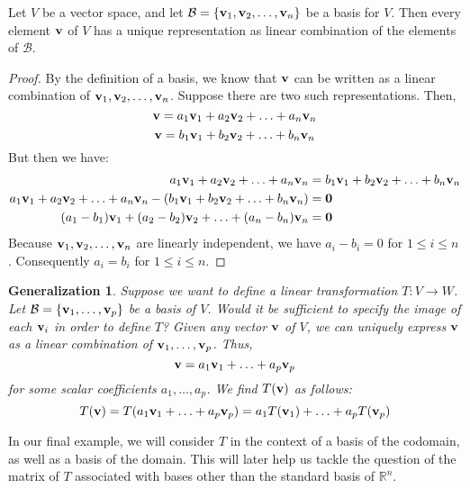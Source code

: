 \documentclass{ximera}
\renewcommand{\vec}[1]{{\bf #1}}
\newcommand{\RR}{\mathbb{R}}
\newtheorem{general}{Generalization}
\begin{document}
\begin{lemma}\label{lemma:uniquerep}
Let $V$ be a vector space, and let $\mathcal{B}=\{\vec{v}_1, \vec{v}_2,\ldots,\vec{v}_n\}$ be a basis for $V$.  Then every element $\vec{v}$ of $V$ has a unique representation as linear combination of the elements of $\mathcal{B}$.
\end{lemma}
\begin{proof}
By the definition of a basis, we know that $\vec{v}$ can be written as a linear combination of $\vec{v}_1, \vec{v}_2,\ldots,\vec{v}_n$.  Suppose there are two such representations.  Then,
$$\vec{v}=a_1\vec{v}_1+ a_2\vec{v}_2+\ldots+a_n\vec{v}_n$$
$$\vec{v}=b_1\vec{v}_1+ b_2\vec{v}_2+\ldots+b_n\vec{v}_n$$
But then we have:
\begin{align*}
a_1\vec{v}_1+ a_2\vec{v}_2+\ldots+a_n\vec{v}_n&=b_1\vec{v}_1+ b_2\vec{v}_2+\ldots+b_n\vec{v}_n\\
a_1\vec{v}_1+ a_2\vec{v}_2+\ldots+a_n\vec{v}_n-(b_1\vec{v}_1+ b_2\vec{v}_2+\ldots+b_n\vec{v}_n)&=\vec{0}\\
(a_1-b_1)\vec{v}_1+ (a_2-b_2)\vec{v}_2+\ldots+(a_n-b_n)\vec{v}_n&=\vec{0}
\end{align*}
Because $\vec{v}_1, \vec{v}_2,\ldots,\vec{v}_n$ are linearly independent, we have $a_i-b_i=0$ for $1\leq i\leq n$. Consequently $a_i=b_i$ for $1\leq i\leq n$.
\end{proof}

\begin{general}
Suppose we want to define a linear transformation $T:V\rightarrow W$.  Let $\mathcal{B}=\{\vec{v}_1,\ldots,\vec{v}_p\}$ be a basis of $V$.  Would it be sufficient to specify the image of each $\vec{v}_i$ in order to define $T$?
Given any vector $\vec{v}$ of $V$, we can uniquely express $\vec{v}$ as a linear combination of $\vec{v}_1,\ldots,\vec{v}_p$.  Thus,
$$\vec{v}=a_1\vec{v}_1+\ldots+a_p\vec{v}_p$$ for some scalar coefficients $a_1,\ldots,a_p$.
We find $T(\vec{v})$ as follows:
$$T(\vec{v})=T(a_1\vec{v}_1+\ldots+a_p\vec{v}_p)=a_1T(\vec{v}_1)+\ldots+a_pT(\vec{v}_p)$$
\end{general}

In our final example, we will consider $T$ in the context of a basis of the codomain, as well as a basis of the domain.  This will later help us tackle the question of the matrix of $T$ associated with bases other than the standard basis of $\RR^n$.
\end{document}
